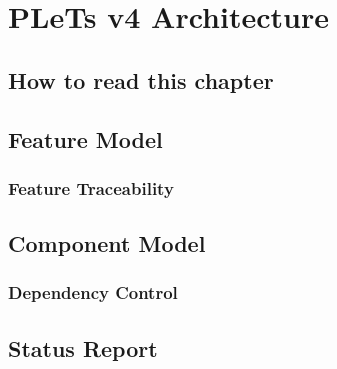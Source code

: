 \chapter{PLeTs v4 Architecture}
\label{ch:architecture}


\section*{How to read this chapter}


\section{Feature Model}


\subsection{Feature Traceability}


\section{Component Model}


\subsection{Dependency Control}


\section{Status Report}
